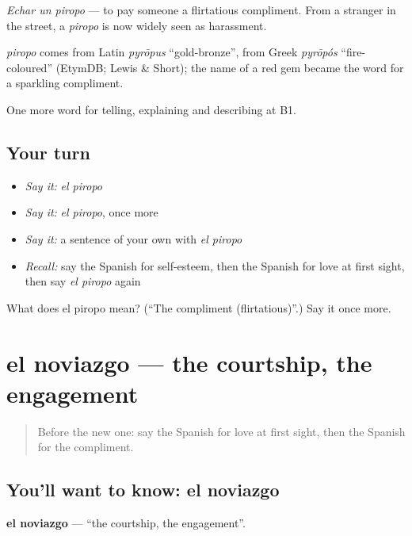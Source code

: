 \emph{Echar un piropo} — to pay someone a flirtatious compliment. From a stranger in the street, a \emph{piropo} is now widely seen as harassment.

\begin{cousinweb}
\emph{piropo} comes from Latin \emph{pyrōpus} \textquotedblleft{}gold-bronze\textquotedblright{}, from Greek \emph{pyrōpós} \textquotedblleft{}fire-coloured\textquotedblright{} (EtymDB; Lewis \& Short); the name of a red gem became the word for a sparkling compliment.
\end{cousinweb}

\begin{grammarlens}[title={What you've built}]
One more word for telling, explaining and describing at B1.
\end{grammarlens}

\subsection*{Your turn}
\begin{itemize}
\raggedright
  \item \emph{Say it:} \emph{el piropo}
  \item \emph{Say it:} \emph{el piropo}, once more
  \item \emph{Say it:} a sentence of your own with \emph{el piropo}
  \item \emph{Recall:} say the Spanish for self-esteem, then the Spanish for love at first sight, then say \emph{el piropo} again
\end{itemize}

\begin{tcolorbox}[breakable,colback=teal!4,colframe=teal!35!black,title={Before you move on}]
What does el piropo mean? (\textquotedblleft{}The compliment (flirtatious)\textquotedblright{}.) Say it once more.
\end{tcolorbox}
\section[el noviazgo]{el noviazgo — the courtship, the engagement}

\label{lesson:ES-C744-noviazgo}



\begin{quote}
Before the new one: say the Spanish for love at first sight, then the Spanish for the compliment.
\end{quote}

\subsection*{You'll want to know: el noviazgo}
\textbf{el noviazgo} — \textquotedblleft{}the courtship, the engagement\textquotedblright{}.

